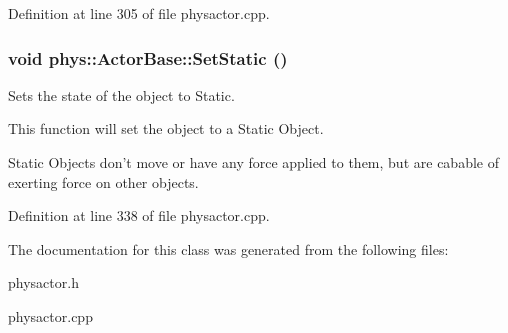 Definition at line 305 of file physactor.cpp.

\hypertarget{classphys_1_1ActorBase_af0219532fe71d1d84042a20a88fe5037}{
\subsubsection[{SetStatic}]{\setlength{\rightskip}{0pt plus 5cm}void phys::ActorBase::SetStatic ()}}
\label{d8/d0f/classphys_1_1ActorBase_af0219532fe71d1d84042a20a88fe5037}


Sets the state of the object to Static. 

This function will set the object to a Static Object. \par
 Static Objects don't move or have any force applied to them, but are cabable of exerting force on other objects. 

Definition at line 338 of file physactor.cpp.



The documentation for this class was generated from the following files:\begin{DoxyCompactItemize}
\item 
physactor.h\item 
physactor.cpp\end{DoxyCompactItemize}
